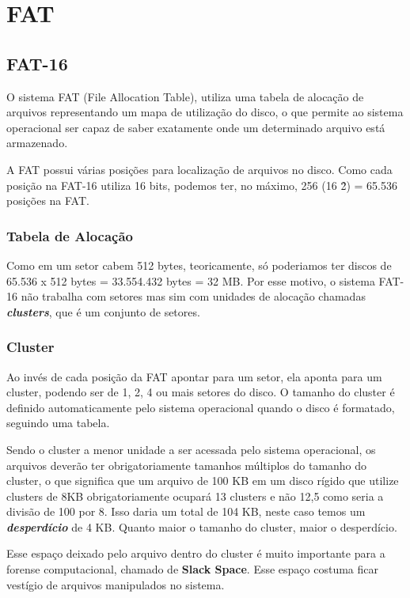 \chapter{FAT}

\section{FAT-16}

O sistema FAT (File Allocation Table), utiliza uma tabela de alocação de arquivos representando um mapa de utilização do disco, o que permite ao sistema operacional ser capaz de saber exatamente onde um determinado arquivo está armazenado.

A FAT possui várias posições para localização de arquivos no disco. Como cada posição na FAT-16 utiliza 16 bits, podemos ter, no máximo, 256 (16 \^ 2) = 65.536 posições na FAT.

\subsection{Tabela de Alocação}

Como em um setor cabem 512 bytes, teoricamente, só poderiamos ter discos de 65.536 x 512 bytes = 33.554.432 bytes = 32 MB. Por esse motivo, o sistema FAT-16 não trabalha com setores mas sim com unidades de alocação chamadas \emph{\textbf{clusters}}, que é um conjunto de setores.

\subsection{Cluster}

Ao invés de cada posição da FAT apontar para um setor, ela aponta para um cluster, podendo ser de 1, 2, 4 ou mais setores do disco. O tamanho do cluster é definido automaticamente pelo sistema operacional quando o disco é formatado, seguindo uma tabela.

Sendo o cluster a menor unidade a ser acessada pelo sistema operacional, os arquivos deverão ter obrigatoriamente tamanhos múltiplos do tamanho do cluster, o que significa que um arquivo de 100 KB em um disco rígido que utilize clusters de 8KB obrigatoriamente ocupará 13 clusters e não 12,5 como seria a divisão de 100 por 8. Isso daria um total de 104 KB, neste caso temos um \emph{\textbf{desperdício}} de 4 KB. Quanto maior o tamanho do cluster, maior o desperdício.

Esse espaço deixado pelo arquivo dentro do cluster é muito importante para a forense computacional, chamado de \textbf{Slack Space}. Esse espaço costuma ficar vestígio de arquivos manipulados no sistema. 

